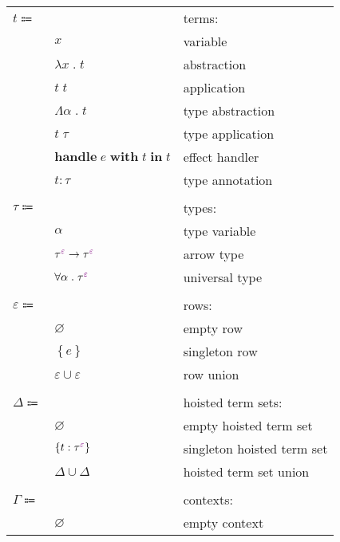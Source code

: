 \documentclass[12pt]{article}
\newcommand\anno[2]{#1 : #2}
\newcommand\term{t}
\newcommand\eVar{x}
\newcommand\eAbs[2]{\lambda #1 \; . \; #2}
\newcommand\eApp[2]{#1 \; #2}
\newcommand\eTAbs[2]{\Lambda #1 \; . \; #2}
\newcommand\eTApp[2]{#1 \; #2}
\newcommand\eHandle[3]{\textbf{handle} \; #1 \; \textbf{with} \; #2 \; \textbf{in} \; #3}
\newcommand\eAnno[2]{\anno{#1}{#2}}
\newcommand\type{\tau}
\newcommand\tVar{\alpha}
\newcommand\tArrow[4]{\tEmbellished{#1}{#2} \rightarrow \tEmbellished{#3}{#4}}
\newcommand\tForall[3]{\forall #1 \; . \; \tEmbellished{#2}{#3}}
\newcommand\tEmbellished[2]{{#1}^{\textcolor{violet}{#2}}}
\newcommand\row{\varepsilon}
\newcommand\rEmpty{\varnothing}
\newcommand\rSingleton[1]{\left\{ #1 \right\}}
\newcommand\rUnion[2]{#1 \cup #2}
\newcommand\hoistedSet{\Delta}
\newcommand\hSingleton[3]{\left\{ \anno{#1}{\tEmbellished{#2}{#3}} \right\}}
\newcommand\hEmpty{\varnothing}
\newcommand\hUnion[2]{#1 \cup #2}
\newcommand\context{\Gamma}
\newcommand\cEmpty{\varnothing}
\newcommand\effect{e}
\begin{document}
      \begin{figure}[H]
        \begin{mdframed}[backgroundcolor=none]
          \begin{center}
            \begin{tabular}{l l l}
              $\term \Coloneqq$ & & terms: \\
              & $\eVar$ & variable \\
              & $\eAbs{\eVar}{\term}$ & abstraction \\
              & $\eApp{\term}{\term}$ & application \\
              & $\eTAbs{\tVar}{\term}$ & type abstraction \\
              & $\eTApp{\term}{\type}$ & type application \\
              & $\eHandle{\effect}{\term}{\term}$ & effect handler \\
              & $\eAnno{\term}{\type}$ & type annotation \\
              \\
              $\type \Coloneqq$ & & types: \\
              & $\tVar$ & type variable \\
              & $\tArrow{\type}{\row}{\type}{\row}$ & arrow type \\
              & $\tForall{\tVar}{\type}{\row}$ & universal type \\
              \\
              $\row \Coloneqq$ & & rows: \\
              & $\rEmpty$ & empty row \\
              & $\rSingleton{\effect}$ & singleton row \\
              & $\rUnion{\row}{\row}$ & row union \\
              \\
              $\hoistedSet \Coloneqq$ & & hoisted term sets: \\
              & $\hEmpty$ & empty hoisted term set \\
              & $\hSingleton{\term}{\type}{\row}$ & singleton hoisted term set \\
              & $\hUnion{\hoistedSet}{\hoistedSet}$ & hoisted term set union \\
              \\
              $\context \Coloneqq$ & & contexts: \\
              & $\cEmpty$ & empty context \\

\end{tabular}
\end{center}
\end{mdframed}
\end{figure}
\end{document}
